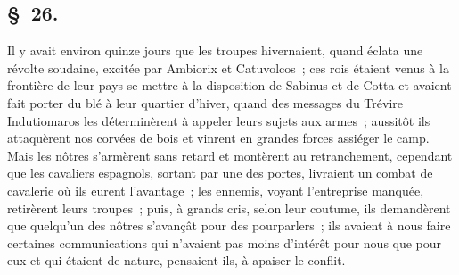\documentclass[french,twoside]{book} %
\begin{document}
\subsection[{§ 26.}]{ \textsc{§ 26.} }
\noindent Il y avait environ quinze jours que les troupes hivernaient, quand éclata une révolte soudaine, excitée par Ambiorix et Catuvolcos ; ces rois étaient venus à la frontière de leur pays se mettre à la disposition de Sabinus et de Cotta et avaient fait porter du blé à leur quartier d’hiver, quand des messages du Trévire Indutiomaros les déterminèrent à appeler leurs sujets aux armes ; aussitôt ils attaquèrent nos corvées de bois et vinrent en grandes forces assiéger le camp. Mais les nôtres s’armèrent sans retard et montèrent au retranchement, cependant que les cavaliers espagnols, sortant par une des portes, livraient un combat de cavalerie où ils eurent l’avantage ; les ennemis, voyant l’entreprise manquée, retirèrent leurs troupes ; puis, à grands cris, selon leur coutume, ils demandèrent que quelqu’un des nôtres s’avançât pour des pourparlers ; ils avaient à nous faire certaines communications qui n’avaient pas moins d’intérêt pour nous que pour eux et qui étaient de nature, pensaient-ils, à apaiser le conflit.
\end{document}
